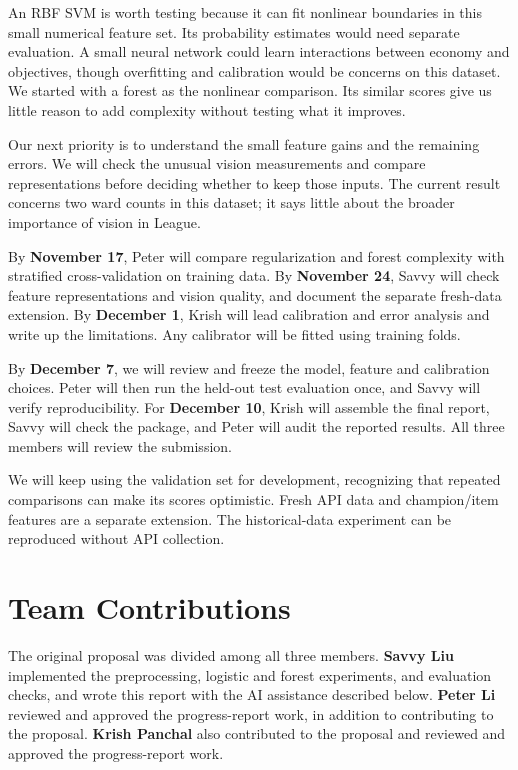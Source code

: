 \documentclass[11pt]{article}
\begin{document}
An RBF SVM is worth testing because it can fit nonlinear boundaries in this small numerical feature set. Its probability estimates would need separate evaluation. A small neural network could learn interactions between economy and objectives, though overfitting and calibration would be concerns on this dataset. We started with a forest as the nonlinear comparison. Its similar scores give us little reason to add complexity without testing what it improves.

Our next priority is to understand the small feature gains and the remaining errors. We will check the unusual vision measurements and compare representations before deciding whether to keep those inputs. The current result concerns two ward counts in this dataset; it says little about the broader importance of vision in League.

By \textbf{November 17}, Peter will compare regularization and forest complexity with stratified cross-validation on training data. By \textbf{November 24}, Savvy will check feature representations and vision quality, and document the separate fresh-data extension. By \textbf{December 1}, Krish will lead calibration and error analysis and write up the limitations. Any calibrator will be fitted using training folds.

By \textbf{December 7}, we will review and freeze the model, feature and calibration choices. Peter will then run the held-out test evaluation once, and Savvy will verify reproducibility. For \textbf{December 10}, Krish will assemble the final report, Savvy will check the package, and Peter will audit the reported results. All three members will review the submission.

We will keep using the validation set for development, recognizing that repeated comparisons can make its scores optimistic. Fresh API data and champion/item features are a separate extension. The historical-data experiment can be reproduced without API collection.

\section*{Team Contributions}

The original proposal was divided among all three members. \textbf{Savvy Liu} implemented the preprocessing, logistic and forest experiments, and evaluation checks, and wrote this report with the AI assistance described below. \textbf{Peter Li} reviewed and approved the progress-report work, in addition to contributing to the proposal. \textbf{Krish Panchal} also contributed to the proposal and reviewed and approved the progress-report work.
\end{document}
